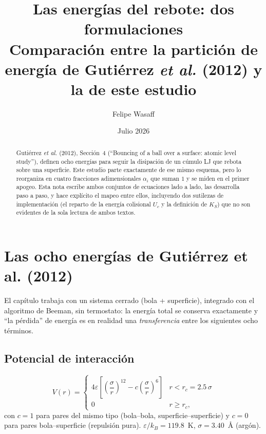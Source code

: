 \documentclass[11pt,a4paper]{article}
\title{\textbf{Las energías del rebote: dos formulaciones}\\
\large Comparación entre la partición de energía de
Gutiérrez \emph{et al.} (2012) y la de este estudio}
\author{Felipe Wasaff}
\date{Julio 2026}
\newcommand{\eps}{\varepsilon}
\newcommand{\kb}{k_B}
\begin{document}
\maketitle

\begin{abstract}
Gutiérrez \emph{et al.} (2012)\cite{Gutierrez2012}, Sección~4
(``Bouncing of a ball over a surface: atomic level study''), definen ocho
energías para seguir la disipación de un cúmulo LJ que rebota sobre una
superficie. Este estudio parte exactamente de ese mismo esquema, pero lo
reorganiza en cuatro fracciones adimensionales $\alpha_i$ que suman $1$ y
se miden en el primer apogeo. Esta nota escribe ambos conjuntos de
ecuaciones lado a lado, las desarrolla paso a paso, y hace explícito el
mapeo entre ellos, incluyendo dos sutilezas de implementación (el reparto
de la energía colisional $U_c$ y la definición de $K_S$) que no son
evidentes de la sola lectura de ambos textos.
\end{abstract}

\tableofcontents

\section{Las ocho energías de Gutiérrez et al. (2012)}
\label{sec:2012}

El capítulo trabaja con un sistema cerrado (bola + superficie), integrado
con el algoritmo de Beeman, sin termostato: la energía total se conserva
exactamente y ``la pérdida'' de energía es en realidad una
\emph{transferencia} entre los siguientes ocho términos.

\subsection{Potencial de interacción}

\begin{equation}
V(r) = \begin{cases}
4\eps\left[\left(\dfrac{\sigma}{r}\right)^{12}
- c\left(\dfrac{\sigma}{r}\right)^{6}\right] & r < r_c=2.5\,\sigma\\[4pt]
0 & r\ge r_c,
\end{cases}
\label{eq:2012_lj}
\end{equation}
con $c=1$ para pares del mismo tipo (bola--bola, superficie--superficie) y
$c=0$ para pares bola--superficie (repulsión pura). $\eps/\kb=119.8$~K,
$\sigma=3.40$~\AA{} (argón).
\end{document}
